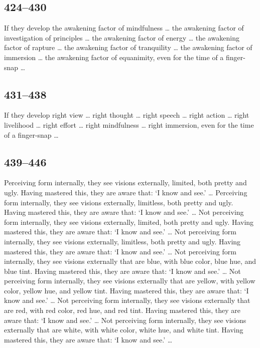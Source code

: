 \documentclass[12pt,openany]{book}%
\begin{document}
\subsection*{424–430 }

If they develop the awakening factor of mindfulness … the awakening factor of investigation of principles … the awakening factor of energy … the awakening factor of rapture … the awakening factor of tranquility … the awakening factor of immersion … the awakening factor of equanimity, even for the time of a finger-snap … 

\subsection*{431–438 }

If they develop right view … right thought … right speech … right action … right livelihood … right effort … right mindfulness … right immersion, even for the time of a finger-snap … 

\subsection*{439–446 }

Perceiving form internally, they see visions externally, limited, both pretty and ugly. Having mastered this, they are aware that: ‘I know and see.’ … Perceiving form internally, they see visions externally, limitless, both pretty and ugly. Having mastered this, they are aware that: ‘I know and see.’ … Not perceiving form internally, they see visions externally, limited, both pretty and ugly. Having mastered this, they are aware that: ‘I know and see.’ … Not perceiving form internally, they see visions externally, limitless, both pretty and ugly. Having mastered this, they are aware that: ‘I know and see.’ … Not perceiving form internally, they see visions externally that are blue, with blue color, blue hue, and blue tint. Having mastered this, they are aware that: ‘I know and see.’ … Not perceiving form internally, they see visions externally that are yellow, with yellow color, yellow hue, and yellow tint. Having mastered this, they are aware that: ‘I know and see.’ … Not perceiving form internally, they see visions externally that are red, with red color, red hue, and red tint. Having mastered this, they are aware that: ‘I know and see.’ … Not perceiving form internally, they see visions externally that are white, with white color, white hue, and white tint. Having mastered this, they are aware that: ‘I know and see.’ … 
\end{document}
